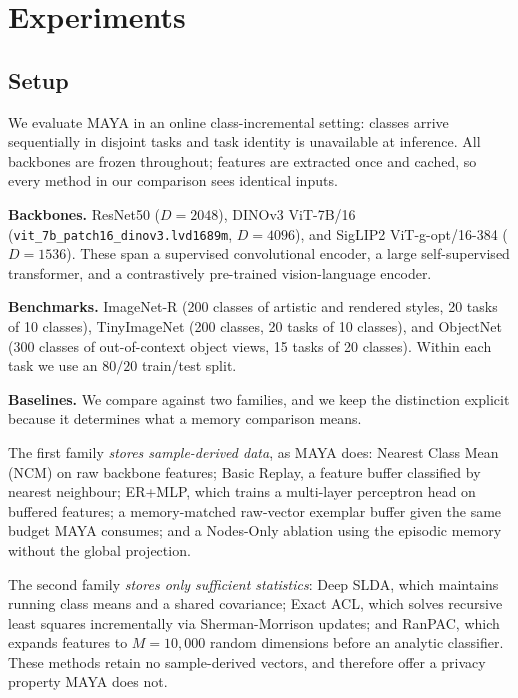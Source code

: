 \section{Experiments}
\label{sec:experiments}


\subsection{Setup}
We evaluate MAYA in an online class-incremental setting: classes arrive sequentially in disjoint tasks and task identity is unavailable at inference. All backbones are frozen throughout; features are extracted once and cached, so every method in our comparison sees identical inputs.

\textbf{Backbones.} ResNet50 ($D{=}2048$), DINOv3 ViT-7B/16 (\texttt{vit\_7b\_patch16\_dinov3.lvd1689m}, $D{=}4096$), and SigLIP2 ViT-g-opt/16-384 ($D{=}1536$). These span a supervised convolutional encoder, a large self-supervised transformer, and a contrastively pre-trained vision-language encoder.

\textbf{Benchmarks.} ImageNet-R (200 classes of artistic and rendered styles, 20 tasks of 10 classes), TinyImageNet (200 classes, 20 tasks of 10 classes), and ObjectNet (300 classes of out-of-context object views, 15 tasks of 20 classes). Within each task we use an $80/20$ train/test split.

\textbf{Baselines.} We compare against two families, and we keep the distinction explicit because it determines what a memory comparison means.

The first family \emph{stores sample-derived data}, as MAYA does: Nearest Class Mean (NCM) on raw backbone features; Basic Replay, a feature buffer classified by nearest neighbour; ER+MLP, which trains a multi-layer perceptron head on buffered features; a memory-matched raw-vector exemplar buffer given the same budget MAYA consumes; and a Nodes-Only ablation using the episodic memory without the global projection.

The second family \emph{stores only sufficient statistics}: Deep SLDA, which maintains running class means and a shared covariance; Exact ACL, which solves recursive least squares incrementally via Sherman-Morrison updates; and RanPAC, which expands features to $M{=}10{,}000$ random dimensions before an analytic classifier. These methods retain no sample-derived vectors, and therefore offer a privacy property MAYA does not.

